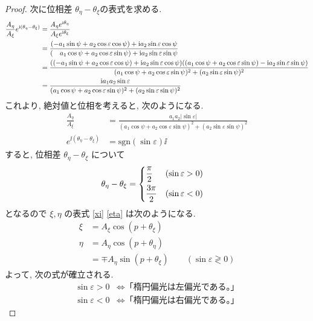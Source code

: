 \documentclass[uplatex,a4paper,dvipdfmx]{jsarticle}
\theoremstyle{definition}
\begin{document}
\begin{proof}
  次に位相差 $\theta_\eta - \theta_\xi$の表式を求める.
  \begin{align}
    \frac{A_\eta}{A_\xi}e^{\mathrm{i}(\theta_\eta - \theta_\xi)}
     & = \frac{A_\eta e^{\mathrm{i}\theta_\eta}}{A_\xi e^{\mathrm{i}\theta_\xi}}                                                                                                                                                                                                 \\
     & = \frac{(-a_1\sin\psi + a_2\cos\varepsilon\cos\psi) + \mathrm{i} a_2\sin\varepsilon\cos\psi}{(\quad a_1\cos\psi + a_2\cos\varepsilon\sin\psi) + \mathrm{i} a_2\sin\varepsilon\sin\psi}                                                                                    \\
     & = \frac{\qty((-a_1\sin\psi + a_2\cos\varepsilon\cos\psi) + \mathrm{i} a_2\sin\varepsilon\cos\psi)\qty((a_1\cos\psi + a_2\cos\varepsilon\sin\psi) - \mathrm{i} a_2\sin\varepsilon\sin\psi)}{(a_1\cos\psi + a_2\cos\varepsilon\sin\psi)^2 + (a_2\sin\varepsilon\sin\psi)^2} \\
     & = \frac{\mathrm{i} a_1a_2\sin\varepsilon}{(a_1\cos\psi + a_2\cos\varepsilon\sin\psi)^2 + (a_2\sin\varepsilon\sin\psi)^2}
  \end{align}
  これより, 絶対値と位相を考えると, 次のようになる.
  \begin{align}
    \frac{A_\eta}{A_\xi}              & = \frac{a_1a_2\lvert\sin\varepsilon\rvert}{(a_1\cos\psi + a_2\cos\varepsilon\sin\psi)^2 + (a_2\sin\varepsilon\sin\psi)^2} \\
    e^{\ii(\theta_\eta - \theta_\xi)} & = \mathrm{sgn}(\sin\varepsilon)\ii
  \end{align}
  すると, 位相差 $\theta_\eta - \theta_\xi$ について
  \begin{align}
    \theta_\eta - \theta_\xi & =
    \begin{dcases}
      \frac{\pi}{2}  & (\sin\varepsilon > 0) \\
      \frac{3\pi}{2} & (\sin\varepsilon < 0)
    \end{dcases}
  \end{align}
  となるので $\xi, \eta$ の表式 \eqref{xi} \eqref{eta} は次のようになる.
  \begin{align}
    \xi  & = A_\xi\cos(p + \theta_\xi)                                          \\
    \eta & = A_\eta\cos(p + \theta_\eta)                                        \\
         & = \mp A_\eta\sin(p + \theta_\xi) \qquad (\sin\varepsilon \gtrless 0)
  \end{align}
  よって, 次の式が確立される.
  \begin{align}
    \sin\varepsilon > 0 & \iff \textrm{「楕円偏光は左偏光である。」} \\
    \sin\varepsilon < 0 & \iff \textrm{「楕円偏光は右偏光である。」}
  \end{align}
\end{proof}
\end{document}
